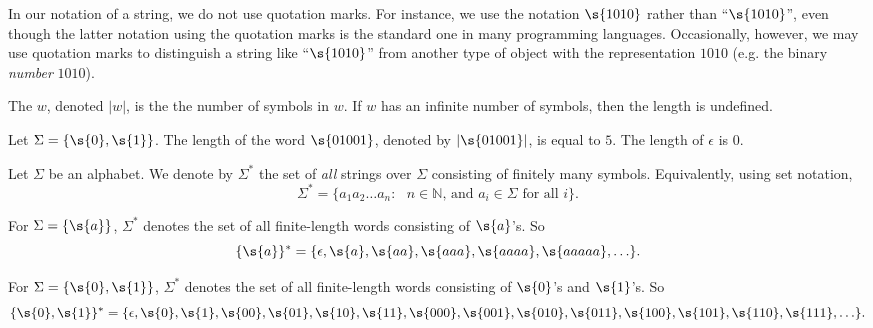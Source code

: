 \begin{note} \label{note:Strings-and-quotation-marks}
In our notation of a string, we do not use quotation marks. For instance, we use the notation $\s{1010}$ rather than ``$\s{1010}$'', even though the latter notation using the quotation marks is the standard one in many programming languages. Occasionally, however, we may use quotation marks to distinguish a string like ``$\s{1010}$'' from another type of object with the representation $1010$ (e.g. the binary \emph{number} $1010$).
\end{note}


\begin{flex}
\begin{definition} \label{definition:Length-of-a-string}
The  $w$, denoted $|w|$, is the the number of symbols in $w$. 
If $w$ has an infinite number of symbols, then the length is undefined.
\end{definition}

\begin{example} \label{example:Lengths-of-01001-and-epsilon}
Let $\Sigma=\{\s{0},\s{1}\}$. 
The length of the word $\s{01001}$, denoted by $|\s{01001}|$, is equal to $5$. 
The length of $\epsilon$ is 0.
\end{example}
\end{flex}


\begin{flex}
\begin{definition} \label{definition:Star-operation-on-alphabets}
Let $\Sigma$ be an alphabet. 
We denote by $\Sigma^*$ the set of \emph{all} strings over $\Sigma$ consisting of finitely many symbols. 
Equivalently, using set notation,
\[
    \Sigma^* = \{a_1a_2\ldots a_n : \text{ $n \in \mathbb{N}$, and $a_i \in \Sigma$ for all $i$}\}.
\]
\end{definition}

\begin{example}[$\{a\}^*$] \label{example:a}
For $\Sigma = \{\s{a}\}$, $\Sigma^*$ denotes the set of all finite-length words consisting of $\s{a}$'s. 
So
\[
    \{\s{a}\}^* = \{\epsilon, \s{a}, \s{aa}, \s{aaa}, \s{aaaa}, \s{aaaaa}, \ldots \}.
\]
\end{example}

\begin{example}[$\{0,1\}^*$] \label{example:01}
For $\Sigma = \{\s{0},\s{1}\}$, $\Sigma^*$ denotes the set of all finite-length words consisting of $\s{0}$'s and $\s{1}$'s. 
So
\[
    \{\s{0},\s{1}\}^* = \{\epsilon, \s{0}, \s{1}, \s{00}, \s{01}, \s{10}, \s{11}, \s{000}, \s{001}, \s{010}, \s{011}, \s{100}, \s{101}, \s{110}, \s{111}, \ldots\}.
\]
\end{example}
\end{flex}


